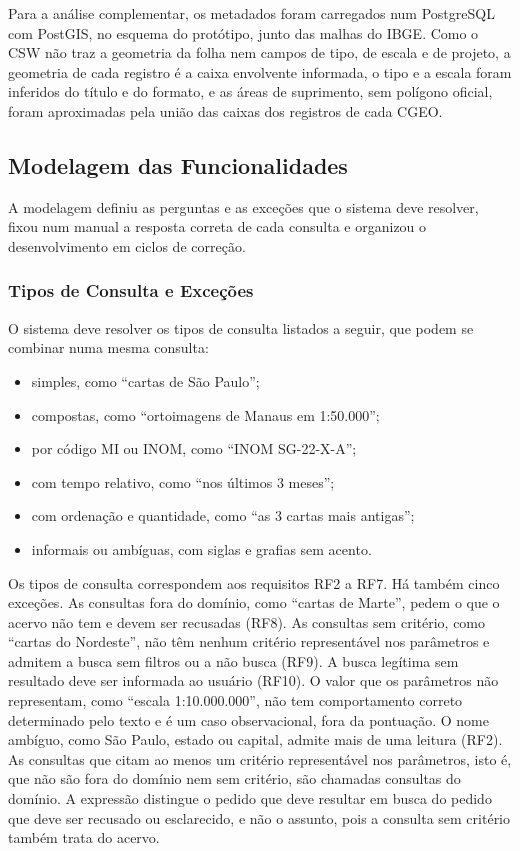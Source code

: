 Para a análise complementar, os metadados foram carregados num PostgreSQL com PostGIS, no esquema do protótipo, junto das malhas do IBGE. Como o CSW não traz a geometria da folha nem campos de tipo, de escala e de projeto, a geometria de cada registro é a caixa envolvente informada, o tipo e a escala foram inferidos do título e do formato, e as áreas de suprimento, sem polígono oficial, foram aproximadas pela união das caixas dos registros de cada CGEO.

\subsection{Modelagem das Funcionalidades}
\label{sec:modelagem}

A modelagem definiu as perguntas e as exceções que o sistema deve resolver, fixou num manual a resposta correta de cada consulta e organizou o desenvolvimento em ciclos de correção.

\subsubsection{Tipos de Consulta e Exceções}
\label{sec:tipos-consulta}

O sistema deve resolver os tipos de consulta listados a seguir, que podem se combinar numa mesma consulta:
\begin{itemize}
  \item simples, como ``cartas de São Paulo'';
  \item compostas, como ``ortoimagens de Manaus em 1:50.000'';
  \item por código MI ou INOM, como ``INOM SG-22-X-A'';
  \item com tempo relativo, como ``nos últimos 3 meses'';
  \item com ordenação e quantidade, como ``as 3 cartas mais antigas'';
  \item informais ou ambíguas, com siglas e grafias sem acento.
\end{itemize}

Os tipos de consulta correspondem aos requisitos RF2 a RF7. Há também cinco exceções. As consultas fora do domínio, como ``cartas de Marte'', pedem o que o acervo não tem e devem ser recusadas (RF8). As consultas sem critério, como ``cartas do Nordeste'', não têm nenhum critério representável nos parâmetros e admitem a busca sem filtros ou a não busca (RF9). A busca legítima sem resultado deve ser informada ao usuário (RF10). O valor que os parâmetros não representam, como ``escala 1:10.000.000'', não tem comportamento correto determinado pelo texto e é um caso observacional, fora da pontuação. O nome ambíguo, como São Paulo, estado ou capital, admite mais de uma leitura (RF2). As consultas que citam ao menos um critério representável nos parâmetros, isto é, que não são fora do domínio nem sem critério, são chamadas consultas do domínio. A expressão distingue o pedido que deve resultar em busca do pedido que deve ser recusado ou esclarecido, e não o assunto, pois a consulta sem critério também trata do acervo.

